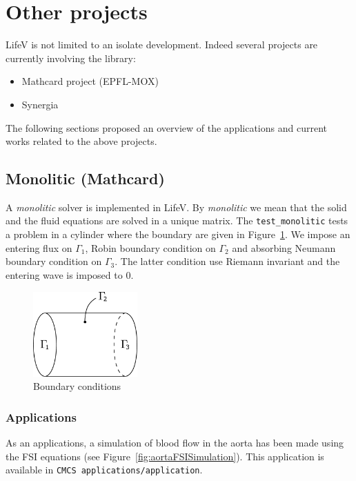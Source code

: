 \documentclass[11pt]{article}
\begin{document}


\section{Other projects}
\label{sec:otherProjects}
LifeV is not limited to an isolate development. Indeed several projects are currently involving the library:
\begin{itemize}
\item Mathcard project (EPFL-MOX)
\item Synergia
\end{itemize}
The following sections proposed an overview of the applications and current works related to the above projects.

\subsection{Monolitic (Mathcard)}
A \emph{monolitic} solver is implemented in LifeV. By \emph{monolitic} we mean that the solid and the fluid equations are solved in a unique matrix. The \texttt{test\_monolitic} tests a problem in a cylinder where the boundary are given in Figure~\ref{fig:monoliticDomain}. We impose an entering flux on $\Gamma_1$, Robin boundary condition on $\Gamma_2$ and absorbing Neumann boundary condition on $\Gamma_3$. The latter condition use Riemann invariant and the entering wave is imposed to $0$.
\begin{figure}[H]
\begin{center}
\includegraphics[width=4cm]{images/monolitic/cylindredomain.pdf}
\caption{Boundary conditions}
\label{fig:monoliticDomain}
\end{center}
\end{figure}

\subsubsection{Applications}
As an applications, a simulation of blood flow in the aorta has been made using the FSI equations (see Figure~\ref{fig:aortaFSISimulation}). This application is available in \texttt{CMCS applications/application}.
\end{document}
